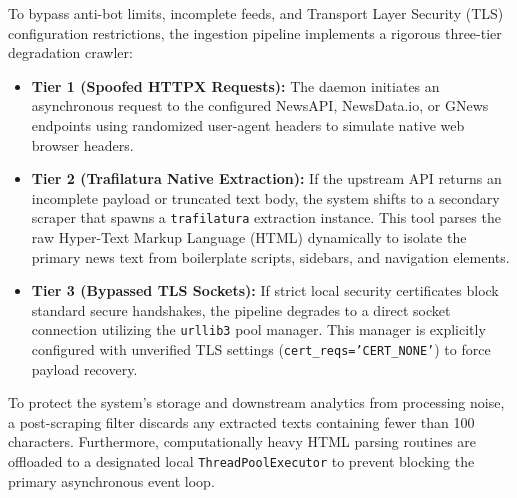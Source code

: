 To bypass anti-bot limits, incomplete feeds, and Transport Layer Security (TLS) configuration restrictions, the ingestion pipeline implements a rigorous three-tier degradation crawler:
\begin{itemize}
    \item \textbf{Tier 1 (Spoofed HTTPX Requests):} The daemon initiates an asynchronous request to the configured NewsAPI, NewsData.io, or GNews endpoints using randomized user-agent headers to simulate native web browser headers.
    \item \textbf{Tier 2 (Trafilatura Native Extraction):} If the upstream API returns an incomplete payload or truncated text body, the system shifts to a secondary scraper that spawns a \texttt{trafilatura} extraction instance. This tool parses the raw Hyper-Text Markup Language (HTML) dynamically to isolate the primary news text from boilerplate scripts, sidebars, and navigation elements.
    \item \textbf{Tier 3 (Bypassed TLS Sockets):} If strict local security certificates block standard secure handshakes, the pipeline degrades to a direct socket connection utilizing the \texttt{urllib3} pool manager. This manager is explicitly configured with unverified TLS settings (\texttt{cert\_reqs='CERT\_NONE'}) to force payload recovery.
\end{itemize}
To protect the system's storage and downstream analytics from processing noise, a post-scraping filter discards any extracted texts containing fewer than 100 characters. Furthermore, computationally heavy HTML parsing routines are offloaded to a designated local \texttt{ThreadPoolExecutor} to prevent blocking the primary asynchronous event loop.

